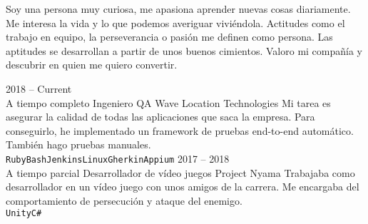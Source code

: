 \documentclass[9pt]{developercv} %
\begin{document}
\vspace{0.5cm}



\begin{minipage}[t]{0.4\textwidth} %
	\vspace{-\baselineskip} %
	Soy una persona muy curiosa, me apasiona aprender nuevas cosas diariamente.
	Me interesa la vida y lo que podemos averiguar viviéndola.
	Actitudes como el trabajo en equipo, la perseverancia o pasión me definen como persona.
	Las aptitudes se desarrollan a partir de unos buenos cimientos.
	Valoro mi compañía y descubrir en quien me quiero convertir.\\
	
\end{minipage}
\hfill %
\begin{minipage}[t]{0.5\textwidth} %
	\vspace{-\baselineskip} %
	\begin{barchart}{5.5}
	\end{barchart}
\end{minipage}



\begin{entrylist}
	\entry
		{2018 -- Current\\\footnotesize{A tiempo completo}}
		{Ingeniero QA}
		{Wave Location Technologies}
		{Mi tarea es asegurar la calidad de todas las aplicaciones que saca la empresa.
		Para conseguirlo, he implementado un framework de pruebas end-to-end automático.
		También hago pruebas manuales.\\ \texttt{Ruby}\slashsep\texttt{Bash}\slashsep\texttt{Jenkins}\slashsep\texttt{Linux}\slashsep\texttt{Gherkin}\slashsep\texttt{Appium}}
	\entry
		{2017 -- 2018\\\footnotesize{A tiempo parcial}}
		{Desarrollador de vídeo juegos}
		{Project Nyama}
		{Trabajaba como desarrollador en un vídeo juego con unos amigos de la carrera.
		Me encargaba del comportamiento de persecución y ataque del enemigo.\\ \texttt{Unity}\slashsep\texttt{C\#}}
\end{entrylist}
\end{document}
